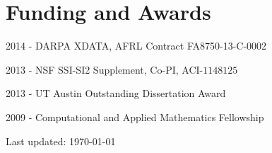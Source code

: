 \documentclass[letterpaper]{article}
\def\footerlink{}
\renewenvironment{itemize}{
  \begin{list}{}{
    \setlength{\leftmargin}{1.5em}
  }
}{
  \end{list}
}
\begin{document}
\section*{Funding and Awards}
\begin{itemize}
\item 2014 - DARPA XDATA, AFRL Contract FA8750-13-C-0002
\item 2013 - NSF SSI-SI2 Supplement, Co-PI, ACI-$1148125$
\item 2013 - UT Austin Outstanding Dissertation Award
\item 2009 - Computational and Applied Mathematics Fellowship
\end{itemize}


\bigskip

\begin{center}
  \begin{footnotesize}
    Last updated: \today \\
    \href{\footerlink}{\texttt{\footerlink}}
  \end{footnotesize}
\end{center}
\end{document}
